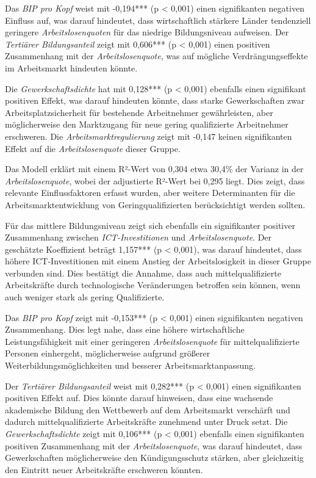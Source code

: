 Das \textit{\ac{BIP} pro Kopf} weist mit -0,194*** (p < 0,001) einen signifikanten negativen 
Einfluss auf, was darauf hindeutet, dass wirtschaftlich stärkere Länder tendenziell geringere 
\textit{Arbeitslosenquoten} für das niedrige Bildungsniveau aufweisen. Der 
\textit{Tertiärer Bildungsanteil} zeigt mit 0,606*** (p < 0,001) einen positiven Zusammenhang mit 
der \textit{Arbeitslosenquote}, was auf mögliche Verdrängungseffekte im Arbeitsmarkt hindeuten 
könnte.

Die \textit{Gewerkschaftsdichte} hat mit 0,128*** (p < 0,001) ebenfalls einen signifikant 
positiven Effekt, was darauf hindeuten könnte, dass starke Gewerkschaften zwar 
Arbeitsplatzsicherheit für bestehende Arbeitnehmer gewährleisten, aber möglicherweise den 
Marktzugang für neue gering qualifizierte Arbeitnehmer erschweren. Die 
\textit{Arbeitsmarktregulierung} zeigt mit -0,147 keinen signifikanten Effekt auf die 
\textit{Arbeitslosenquote} dieser Gruppe.

Das Modell erklärt mit einem R²-Wert von 0,304 etwa 30,4\% der Varianz in der 
\textit{Arbeitslosenquote}, wobei der adjustierte R²-Wert bei 0,295 liegt. Dies zeigt, dass 
relevante Einflussfaktoren erfasst wurden, aber weitere Determinanten für die 
Arbeitsmarktentwicklung von Geringqualifizierten berücksichtigt werden sollten.

Für das mittlere Bildungsniveau zeigt sich ebenfalls ein signifikanter positiver Zusammenhang 
zwischen \textit{\ac{ICT}-Investitionen} und \textit{Arbeitslosenquote}. Der geschätzte 
Koeffizient beträgt 1,157*** (p < 0,001), was darauf hindeutet, dass höhere 
\ac{ICT}-Investitionen mit einem Anstieg der Arbeitslosigkeit in dieser Gruppe verbunden sind. 
Dies bestätigt die Annahme, dass auch mittelqualifizierte Arbeitskräfte durch technologische 
Veränderungen betroffen sein können, wenn auch weniger stark als gering Qualifizierte.

Das \textit{\ac{BIP} pro Kopf} zeigt mit -0,153*** (p < 0,001) einen signifikanten negativen 
Zusammenhang. Dies legt nahe, dass eine höhere wirtschaftliche Leistungsfähigkeit mit einer 
geringeren \textit{Arbeitslosenquote} für mittelqualifizierte Personen einhergeht, möglicherweise 
aufgrund größerer Weiterbildungsmöglichkeiten und besserer Arbeitsmarktanpassung.

Der \textit{Tertiärer Bildungsanteil} weist mit 0,282*** (p < 0,001) einen signifikanten 
positiven Effekt auf. Dies könnte darauf hinweisen, dass eine wachsende akademische Bildung den 
Wettbewerb auf dem Arbeitsmarkt verschärft und dadurch mittelqualifizierte Arbeitskräfte 
zunehmend unter Druck setzt. Die \textit{Gewerkschaftsdichte} zeigt mit 0,106*** (p < 0,001) 
ebenfalls einen signifikanten positiven Zusammenhang mit der \textit{Arbeitslosenquote}, was 
darauf hindeutet, dass Gewerkschaften möglicherweise den Kündigungsschutz stärken, aber 
gleichzeitig den Eintritt neuer Arbeitskräfte erschweren könnten.

